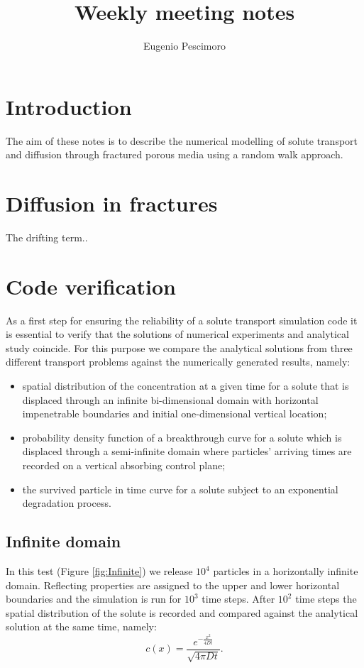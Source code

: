 \documentclass{article}
\title{Weekly meeting notes}
\author{Eugenio Pescimoro }
\begin{document}
\maketitle

\section{Introduction}
The aim of these notes is to describe the numerical modelling of solute transport and diffusion through fractured porous media using a random walk approach.

\FloatBarrier  %
\section{Diffusion in fractures}
The drifting term..

\FloatBarrier  %
\section{Code verification}
As a first step for ensuring the reliability of a solute transport simulation code it is essential to verify that the solutions of numerical experiments and analytical study coincide. For this purpose we compare the analytical solutions from three different transport problems against the numerically generated results, namely:
\begin{itemize}
    \item spatial distribution of the concentration at a given time for a solute that is displaced through an infinite bi-dimensional domain with horizontal impenetrable boundaries and initial one-dimensional vertical location;
    \item probability density function of a breakthrough curve for a solute which is displaced through a semi-infinite domain where particles' arriving times are recorded on a vertical absorbing control plane;
    \item the survived particle in time curve for a solute subject to an exponential degradation process. 
\end{itemize}

\subsection{Infinite domain}
In this test (Figure \ref{fig:Infinite}) we release $10^4$ particles in a horizontally infinite domain. Reflecting properties are assigned to the upper and lower horizontal boundaries and the simulation is run for $10^3$ time steps. After $10^2$ time steps the spatial distribution of the solute is recorded and compared against the analytical solution at the same time, namely:
\begin{equation}
    c(x) = \frac{e^{-\frac{x^2}{4 D t}}}{\sqrt{4 \pi D t}}.
\end{equation}
\end{document}
